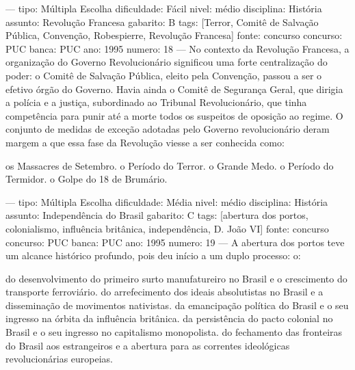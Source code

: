 ---
tipo: Múltipla Escolha
dificuldade: Fácil
nivel: médio
disciplina: História
assunto: Revolução Francesa
gabarito: B
tags: [Terror, Comitê de Salvação Pública, Convenção, Robespierre, Revolução Francesa]
fonte: concurso
concurso: PUC
banca: PUC
ano: 1995
numero: 18
---
\question
No contexto da Revolução Francesa, a organização do Governo Revolucionário significou uma forte centralização do poder: o Comitê de Salvação Pública, eleito pela Convenção, passou a ser o efetivo órgão do Governo. Havia ainda o Comitê de Segurança Geral, que dirigia a polícia e a justiça, subordinado ao Tribunal Revolucionário, que tinha competência para punir até a morte todos os suspeitos de oposição ao regime. O conjunto de medidas de exceção adotadas pelo Governo revolucionário deram margem a que essa fase da Revolução viesse a ser conhecida como:
\begin{choices}
\choice os Massacres de Setembro.
\CorrectChoice o Período do Terror.
\choice o Grande Medo.
\choice o Período do Termidor.
\choice o Golpe do 18 de Brumário.
\end{choices}

---
tipo: Múltipla Escolha
dificuldade: Média
nivel: médio
disciplina: História
assunto: Independência do Brasil
gabarito: C
tags: [abertura dos portos, colonialismo, influência britânica, independência, D. João VI]
fonte: concurso
concurso: PUC
banca: PUC
ano: 1995
numero: 19
---
\question
A abertura dos portos teve um alcance histórico profundo, pois deu início a um duplo processo: o:
\begin{choices}
\choice do desenvolvimento do primeiro surto manufatureiro no Brasil e o crescimento do transporte ferroviário.
\choice do arrefecimento dos ideais absolutistas no Brasil e a disseminação de movimentos nativistas.
\CorrectChoice da emancipação política do Brasil e o seu ingresso na órbita da influência britânica.
\choice da persistência do pacto colonial no Brasil e o seu ingresso no capitalismo monopolista.
\choice do fechamento das fronteiras do Brasil aos estrangeiros e a abertura para as correntes ideológicas revolucionárias europeias.
\end{choices}
